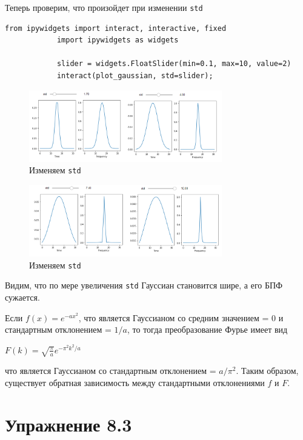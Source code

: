 \documentclass[a4paper,12pt]{article}
\begin{document}
\begin{enumerate}
		Теперь проверим, что произойдет при изменении \texttt{std}
		\begin{lstlisting}[caption=Изменяем \texttt{std}]
			from ipywidgets import interact, interactive, fixed
			import ipywidgets as widgets
			
			slider = widgets.FloatSlider(min=0.1, max=10, value=2)
			interact(plot_gaussian, std=slider);
		\end{lstlisting}
		\begin{figure}[H]
			\centering
			\includegraphics[width=0.75\textwidth]{2_5.png}
			\caption{Изменяем \texttt{std}}
			\label{fig:2.5}
		\end{figure}
		\begin{figure}[H]
			\centering
			\includegraphics[width=0.75\textwidth]{2_6.png}
			\caption{Изменяем \texttt{std}}
			\label{fig:2.6}
		\end{figure}
		
		Видим, что по мере увеличения \texttt{std} Гауссиан становится шире, а его БПФ сужается.
		
		Если $f(x) = e^{-a x^2}$, что является Гауссианом со средним значением =  0 и стандартным отклонением = $1/a$, то тогда преобразование Фурье имеет вид
		
		$F(k) = \sqrt{\frac{\pi}{a}} e^{-\pi^2 k^2/a}$
		
		что является Гауссианом со стандартным отклонением = $a / \pi^2$. Таким образом, существует обратная зависимость между стандартными отклонениями $f$ и $F$.
		
		\section{Упражнение 8.3}
		
		\begin{enumerate}
			

\end{enumerate}
\end{enumerate}
\end{document}
